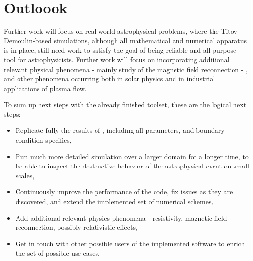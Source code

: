 \section{Outloook}
Further work will focus on real-world astrophysical problems, where the Titov-Demoulin-based simulations, although all mathematical and numerical apparatus is in place, still need work to satisfy the goal of being reliable and all-purpose tool for astrophysicists. Further work will focus on incorporating additional relevant physical phenomena - mainly study of the magnetic field reconnection - \citep{reconnection}, and other phenomena occurring both in solar physics and in industrial applications of plasma flow.

To sum up next steps with the already finished toolset, these are the logical next steps:
\begin{itemize}
\item Replicate fully the results of \cite{miraClanek}, including all parameters, and boundary condition specifics,
\item Run much more detailed simulation over a larger domain for a longer time, to be able to inspect the destructive behavior of the astrophysical event on small scales,
\item Continuously improve the performance of the code, fix issues as they are discovered, and extend the implemented set of numerical schemes,
\item Add additional relevant physics phenomena - resistivity, magnetic field reconnection, possibly relativistic effects,
\item Get in touch with other possible users of the implemented software to enrich the set of possible use cases.
\end{itemize}